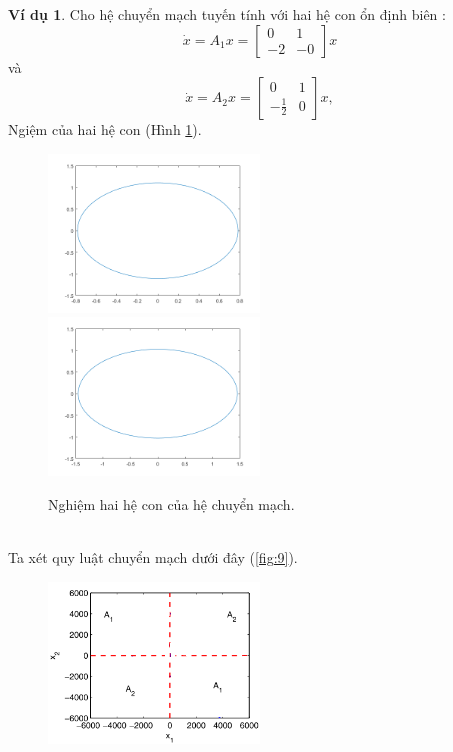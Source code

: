 \documentclass[14pt,a4paper,oneside]{report}		%
\theoremstyle{definition}
\newtheorem{example}[theorem]{Ví dụ}
\begin{document}
\begin{example}
Cho hệ chuyển mạch tuyến tính với hai hệ con ổn định biên \cite{DATN5}:
$$\dot{x}=A_1x=
\begin{bmatrix}
0 & 1\\
-2 & -0
\end{bmatrix}x$$
và
$$\dot{x}=A_2x=
\begin{bmatrix}
0 & 1\\
-\frac{1}{2} & 0
\end{bmatrix}x,$$
Ngiệm của hai hệ con (Hình \ref{fig:8}).\\
\begin{figure}[h]
\includegraphics[width=0.5\textwidth]{graph8.png}
\hspace{\fill}
\includegraphics[width=0.5\textwidth]{graph9.png}
\caption{Nghiệm hai hệ con của hệ chuyển mạch.}\label{fig:8}
\end{figure}\\
Ta xét quy luật chuyển mạch dưới đây (\ref{fig:9}).\\
\begin{figure}[h]
\centering
\includegraphics[width=0.5\textwidth]{graph13.png}

\end{figure}
\end{example}
\end{document}
